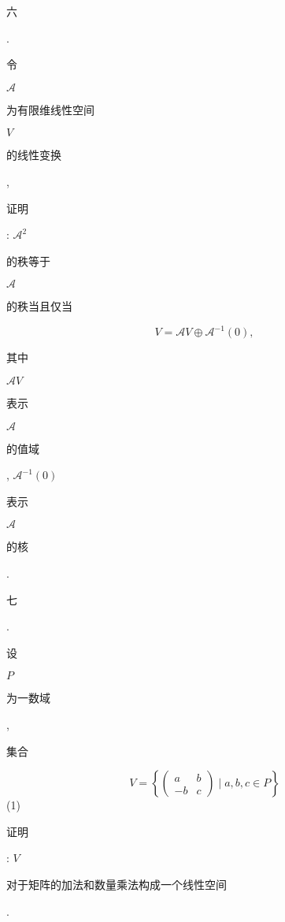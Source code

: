 \documentclass[10pt]{article}
\begin{document}
\begin{CJK}{UTF8}{mj}六\end{CJK}. \begin{CJK}{UTF8}{mj}令\end{CJK} $\mathscr{A}$ \begin{CJK}{UTF8}{mj}为有限维线性空间\end{CJK} $V$ \begin{CJK}{UTF8}{mj}的线性变换\end{CJK}, \begin{CJK}{UTF8}{mj}证明\end{CJK}: $\mathscr{A}^{2}$ \begin{CJK}{UTF8}{mj}的秩等于\end{CJK} $\mathscr{A}$ \begin{CJK}{UTF8}{mj}的秩当且仅当\end{CJK}
$$
V=\mathscr{A} V \oplus \mathscr{A}^{-1}(0),
$$
\begin{CJK}{UTF8}{mj}其中\end{CJK} $\mathscr{A} V$ \begin{CJK}{UTF8}{mj}表示\end{CJK} $\mathscr{A}$ \begin{CJK}{UTF8}{mj}的值域\end{CJK}, $\mathscr{A}^{-1}(0)$ \begin{CJK}{UTF8}{mj}表示\end{CJK} $\mathscr{A}$ \begin{CJK}{UTF8}{mj}的核\end{CJK}. \begin{CJK}{UTF8}{mj}七\end{CJK}. \begin{CJK}{UTF8}{mj}设\end{CJK} $P$ \begin{CJK}{UTF8}{mj}为一数域\end{CJK}, \begin{CJK}{UTF8}{mj}集合\end{CJK}
$$
V=\left\{\left(\begin{array}{cc}
a & b \\
-b & c
\end{array}\right) \mid a, b, c \in P\right\}
$$
(1) \begin{CJK}{UTF8}{mj}证明\end{CJK}: $V$ \begin{CJK}{UTF8}{mj}对于矩阵的加法和数量乘法构成一个线性空间\end{CJK}.
\end{document}
